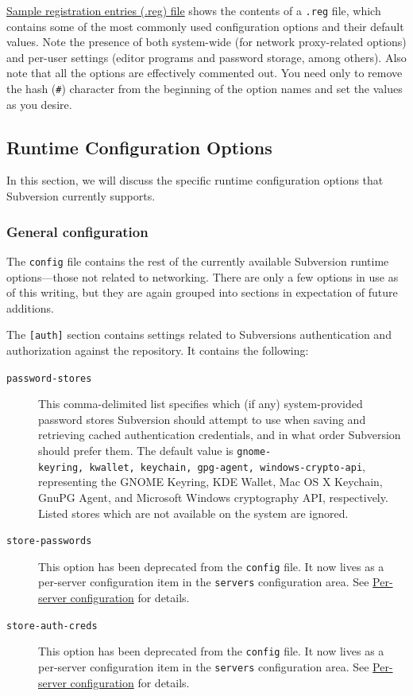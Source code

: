 \hyperref[svn.advanced.confarea.windows-registry.ex-1]{Sample
registration entries (.reg) file} shows the contents of a \texttt{.reg}
file, which contains some of the most commonly used configuration
options and their default values. Note the presence of both system-wide
(for network proxy-related options) and per-user settings (editor
programs and password storage, among others). Also note that all the
options are effectively commented out. You need only to remove the hash
(\texttt{\#}) character from the beginning of the option names and set
the values as you desire.

\subsection{Runtime Configuration
Options}\label{svn.advanced.confarea.opts}

In this section, we will discuss the specific runtime configuration
options that Subversion currently supports.

\subsubsection{General
configuration}\label{svn.advanced.confarea.opts.config}

The \texttt{config} file contains the rest of the currently available
Subversion runtime options---those not related to networking. There are
only a few options in use as of this writing, but they are again grouped
into sections in expectation of future additions.

The \texttt{{[}auth{]}} section contains settings related to
Subversion\textquotesingle s authentication and authorization against
the repository. It contains the following:

\begin{description}
\item[\texttt{password-stores}]
This comma-delimited list specifies which (if any) system-provided
password stores Subversion should attempt to use when saving and
retrieving cached authentication credentials, and in what order
Subversion should prefer them. The default value is
\texttt{gnome-keyring,\ kwallet,\ keychain,\ gpg-agent,\ windows-crypto-api},
representing the GNOME Keyring, KDE Wallet, Mac OS X Keychain, GnuPG
Agent, and Microsoft Windows cryptography API, respectively. Listed
stores which are not available on the system are ignored.
\item[\texttt{store-passwords}]
This option has been deprecated from the \texttt{config} file. It now
lives as a per-server configuration item in the \texttt{servers}
configuration area. See
\hyperref[svn.advanced.confarea.opts.servers]{Per-server configuration}
for details.
\item[\texttt{store-auth-creds}]
This option has been deprecated from the \texttt{config} file. It now
lives as a per-server configuration item in the \texttt{servers}
configuration area. See
\hyperref[svn.advanced.confarea.opts.servers]{Per-server configuration}
for details.
\end{description}

